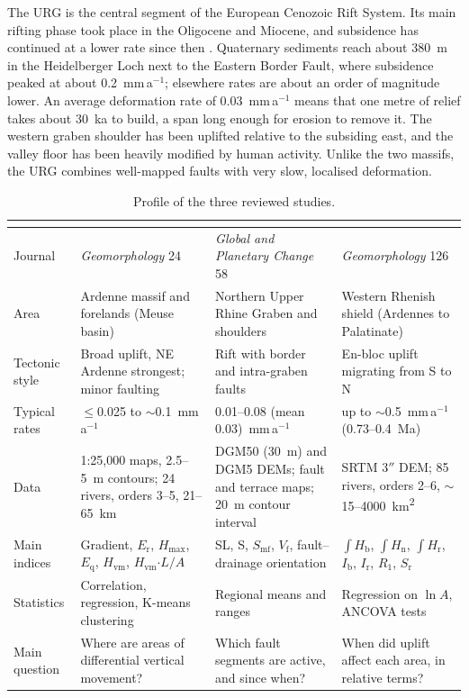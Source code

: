\documentclass[10pt,a4paper,twocolumn]{article}
\newcommand{\kmsq}{km\textsuperscript{2}}
\newcommand{\Hb}{\ensuremath{\int\!H_\mathrm{b}}}
\newcommand{\Hn}{\ensuremath{\int\!H_\mathrm{n}}}
\newcommand{\Hr}{\ensuremath{\int\!H_\mathrm{r}}}
\newcommand{\Hvm}{\ensuremath{H_\mathrm{vm}}}
\begin{document}
The URG is the central segment of the European Cenozoic Rift System. Its main rifting phase took place
in the Oligocene and Miocene, and subsidence has continued at a lower rate since then
\citep{PetersVanBalen2007}. Quaternary sediments reach about 380~m in the Heidelberger Loch next to the
Eastern Border Fault, where subsidence peaked at about 0.2~mm\,a$^{-1}$; elsewhere rates are about an
order of magnitude lower. An average deformation rate of 0.03~mm\,a$^{-1}$ means that one metre of
relief takes about 30~ka to build, a span long enough for erosion to remove it. The western graben
shoulder has been uplifted relative to the subsiding east, and the valley floor has been heavily
modified by human activity. Unlike the two massifs, the URG combines well-mapped faults
with very slow, localised deformation.

\begin{table}[t]
\centering
\caption{Profile of the three reviewed studies.}
\label{tab:profile}
\footnotesize
\begin{tabularx}{\textwidth}{@{}P{2.6cm}LLL@{}}
\toprule
& \textbf{\citet{Demoulin1998}} & \textbf{\citet{PetersVanBalen2007}} & \textbf{\citet{Demoulin2011}}\\
\midrule
Journal & \textit{Geomorphology} 24 & \textit{Global and Planetary Change} 58 & \textit{Geomorphology} 126\\
Area & Ardenne massif and forelands (Meuse basin) & Northern Upper Rhine Graben and shoulders & Western Rhenish shield (Ardennes to Palatinate)\\
Tectonic style & Broad uplift, NE Ardenne strongest; minor faulting & Rift with border and intra-graben faults & En-bloc uplift migrating from S to N\\
Typical rates & $\le$0.025 to $\sim$0.1~mm\,a$^{-1}$ & 0.01--0.08 (mean 0.03)~mm\,a$^{-1}$ & up to $\sim$0.5~mm\,a$^{-1}$ (0.73--0.4~Ma)\\
Data & 1:25,000 maps, 2.5--5~m contours; 24 rivers, orders 3--5, 21--65~km & DGM50 (30~m) and DGM5 DEMs; fault and terrace maps; 20~m contour interval & SRTM 3$''$ DEM; 85 rivers, orders 2--6, $\sim$15--4000~\kmsq{}\\
Main indices & Gradient, $E_\mathrm{r}$, $H_\mathrm{max}$, $E_\mathrm{q}$, \Hvm, \Hvm$\cdot L/A$ & SL, S, $S_\mathrm{mf}$, $V_\mathrm{f}$, fault--drainage orientation & \Hb, \Hn, \Hr, $I_\mathrm{b}$, $I_\mathrm{r}$, $R_1$, $S_\mathrm{r}$\\
Statistics & Correlation, regression, K-means clustering & Regional means and ranges & Regression on $\ln A$, ANCOVA tests\\
Main question & Where are areas of differential vertical movement? & Which fault segments are active, and since when? & When did uplift affect each area, in relative terms?\\
\bottomrule
\end{tabularx}
\end{table}
\end{document}
